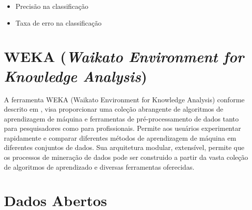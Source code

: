 \documentclass[
	12pt,				%
	openright,			%
	oneside,	
	a4paper,				%
	english,				%
	brazil				%
]{abntex2/abntex2} %
\begin{document}
	\begin{itemize}
		\item Precisão na classificação
		\item Taxa de erro na classificação
	\end{itemize}
		

	\section{WEKA (\textit{Waikato Environment for Knowledge Analysis})}
	
	A ferramenta WEKA (Waikato Environment for Knowledge Analysis)  conforme descrito em \cite{hall:2009}, visa proporcionar uma coleção abrangente de algoritmos de aprendizagem de máquina e ferramentas de pré-processamento de dados tanto para pesquisadores como para profissionais. Permite aos usuários experimentar rapidamente e comparar diferentes métodos de aprendizagem de máquina em diferentes conjuntos de dados. Sua arquitetura modular, extensível, permite que os processos de mineração de dados pode ser construido a partir da vasta coleção de algoritmos de aprendizado e diversas ferramentas oferecidas.
		
	\section{Dados Abertos}
\end{document}

